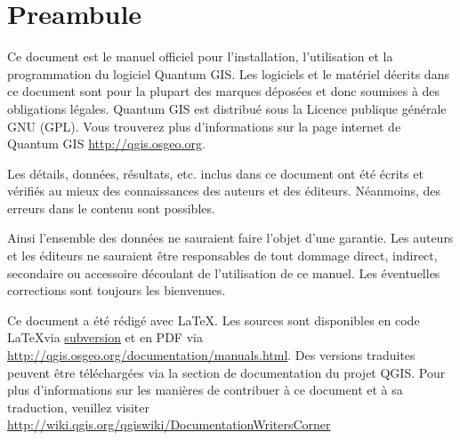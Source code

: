 \newcommand\qgistip[1]{\raggedright\small{#1}}
\renewcommand{\topfraction}{0.85}
\renewcommand{\textfraction}{0.1}
\renewcommand{\floatpagefraction}{0.75}

\thispagestyle{empty}


\section*{Preambule}


\vspace{1cm}


Ce document est le manuel officiel pour l'installation, l'utilisation et la programmation du logiciel Quantum GIS. Les logiciels et le mat\'eriel d\'ecrits dans ce document sont pour la plupart des marques d\'epos\'ees et donc soumises \`a des obligations l\'egales. Quantum GIS est distribu\'e sous la Licence publique g\'en\'erale GNU (GPL). Vous trouverez plus d'informations sur la page internet de Quantum GIS \url{http://qgis.osgeo.org}.

Les d\'etails, donn\'ees, r\'esultats, etc. inclus dans ce document ont \'et\'e \'ecrits et v\'erifi\'es au mieux des connaissances des auteurs et des \'editeurs. N\'eanmoins, des erreurs dans le contenu sont possibles.

Ainsi l'ensemble des donn\'ees ne sauraient faire l'objet d'une garantie. Les auteurs et les \'editeurs ne sauraient \^etre responsables de tout dommage direct, indirect, secondaire ou accessoire d\'ecoulant de l'utilisation de ce manuel. Les \'eventuelles corrections sont toujours les bienvenues.

Ce document a \'et\'e r\'edig\'e avec \LaTeX. Les sources sont disponibles en code \LaTeX via \href{http://wiki.qgis.org/qgiswiki/DocumentationWritersCorner}{subversion} et en PDF via \url{http://qgis.osgeo.org/documentation/manuals.html}. 
Des versions traduites peuvent \^etre t\'el\'echarg\'ees via la section de documentation du projet QGIS. Pour plus d'informations sur les mani\`eres de contribuer \`a ce document et \`a sa traduction, veuillez visiter \url{http://wiki.qgis.org/qgiswiki/DocumentationWritersCorner} 

